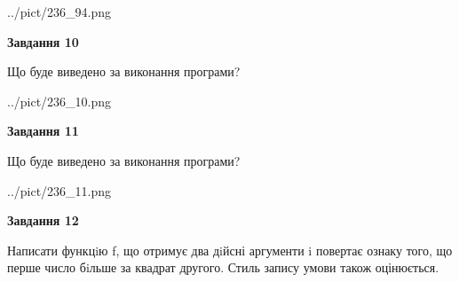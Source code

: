 \documentclass[12pt, ukrainian]{article}
\begin{document}
{\begin {large}
\begin{center}
	{../pict/236_94.png}
\end{center}
\newpage

{\begin {center}\textbf{Завдання 10}\end {center}}

Що буде виведено за виконання програми?\par
\begin{center}
	{../pict/236_10.png}
\end{center}
\newpage

{\begin {center}\textbf{Завдання 11}\end {center}}

Що буде виведено за виконання програми?\par
\begin{center}
	{../pict/236_11.png}
\end{center}
\newpage

{\begin {center}\textbf{Завдання 12}\end {center}}


Написати функцiю f, що отримує два дiйсні аргументи i повертає ознаку того, що перше число бiльше за квадрат другого. Стиль запису умови також оцінюється.\par
\newpage

\end {large}}
\end{document}
